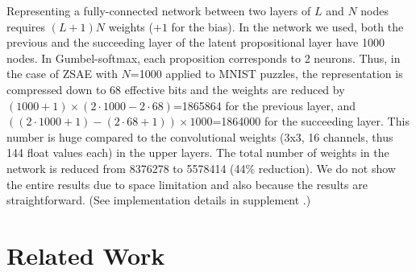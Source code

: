 Representing a fully-connected
network between two layers of $L$ and $N$ nodes requires $(L+1)N$
weights ($+1$ for the bias).
In the network we used,
both the previous and the succeeding layer of the latent propositional layer have 1000 nodes.
In Gumbel-softmax, each proposition corresponds to 2 neurons.
Thus, in the case of ZSAE with $N$=1000 applied to MNIST puzzles,
the representation is compressed down to 68 effective bits and
the weights are reduced by $(1000+1)\times (2\cdot 1000 - 2\cdot 68)$=1865864 for the previous layer,
and $((2\cdot 1000+1)-(2\cdot 68+1))\times 1000 $=1864000 for the succeeding layer.
This number is huge compared to the convolutional weights (3x3, 16 channels, thus 144 float values each) in the upper layers.
The total number of weights in the network is reduced from 8376278 to 5578414 (44\% reduction).
We do not show the entire results due to space limitation and also because the results are straightforward.
(See implementation details in supplement .)


\section{Related Work}

